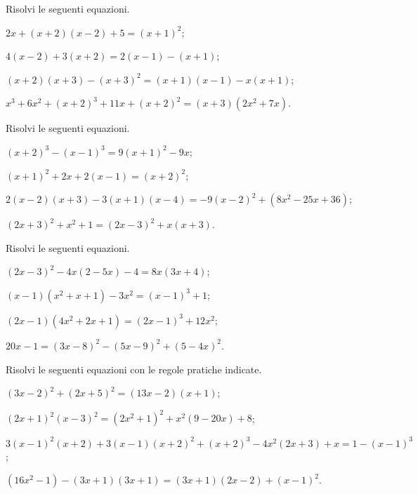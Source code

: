 \begin{esercizio}[\Ast]
\label{ese:15.18}
Risolvi le seguenti equazioni.
 \begin{enumeratea}
 \item $2x+(x+2)(x-2)+5=(x+1)^{2}$;
 \item $4(x-2)+3(x+2)=2(x-1)-(x+1)$;
 \item $(x+2)(x+3)-(x+3)^{2}=(x+1)(x-1)-x(x+1)$;
 \item $x^{3}+6x^{2}+(x+2)^{3}+11x+(x+2)^{2}=(x+3)\left(2x^{2}+7x\right)$.
 \end{enumeratea}
\end{esercizio}

\begin{esercizio}[\Ast]
\label{ese:15.19}
Risolvi le seguenti equazioni.
 \begin{enumeratea}
 \item $(x+2)^{3}-(x-1)^{3}=9(x+1)^{2}-9x$;
 \item $(x+1)^{2}+2x+2(x-1)=(x+2)^{2}$;
 \item $2(x-2)(x+3)-3(x+1)(x-4)=-9(x-2)^{2}+\left(8x^{2}-25x+36\right)$;
 \item $(2x+3)^{2}+x^{2}+1=(2x-3)^{2}+x(x+3)$.
 \end{enumeratea}
\end{esercizio}

\begin{esercizio}[\Ast]
\label{ese:15.20}
Risolvi le seguenti equazioni.
 \begin{enumeratea}
 \item $(2x-3)^{2}-4x(2-5x)-4=8x(3x+4)$;
 \item $(x-1)\left(x^{2}+x+1\right)-3x^{2}=(x-1)^{3}+1$;
 \item $(2x-1)\left(4x^{2}+2x+1\right)=(2x-1)^{3}+12x^{2}$;
 \item $20x-1=(3x-8)^{2}-(5x-9)^{2}+(5-4x)^{2}$.
 \end{enumeratea}
\end{esercizio}

\begin{esercizio}[\Ast]
\label{ese:15.21}
Risolvi le seguenti equazioni con le regole pratiche indicate.
 \begin{enumeratea}
 \item $(3x-2)^{2}+(2x+5)^{2}=(13x-2)(x+1)$;
 \item $(2x+1)^{2}(x-3)^{2}=\left(2x^{2}+1\right)^{2}+x^{2}(9-20x)+8$;
 \item $3(x-1)^{2}(x+2)+3(x-1)(x+2)^{2}+(x+2)^{3}-4x^{2}(2x+3)+x=1-(x-1)^{3}$;
 \item $\left(16x^{2}-1\right)-(3x+1)(3x+1)=(3x+1)(2x-2)+(x-1)^{2}$.
 \end{enumeratea}
\end{esercizio}

